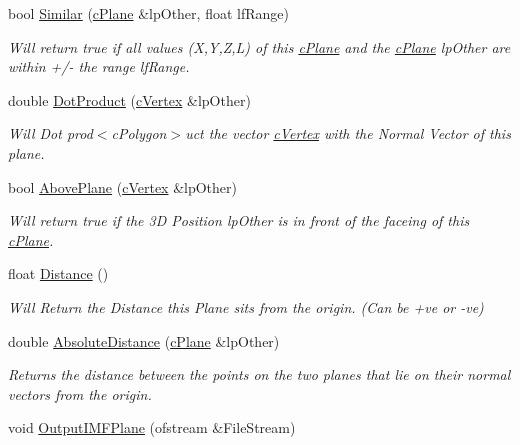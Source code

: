 \begin{DoxyCompactItemize}
bool \hyperlink{classc_plane_a54a4b9d1cc5624882862ea31f3d0df47}{Similar} (\hyperlink{classc_plane}{cPlane} \&lpOther, float lfRange)
\begin{DoxyCompactList}\small\item\em Will return true if all values (X,Y,Z,L) of this \hyperlink{classc_plane}{cPlane} and the \hyperlink{classc_plane}{cPlane} lpOther are within +/-\/ the range lfRange. \item\end{DoxyCompactList}\item 
double \hyperlink{classc_plane_a1861b4a3e79e16889324f0c9e580fc06}{DotProduct} (\hyperlink{classc_vertex}{cVertex} \&lpOther)
\begin{DoxyCompactList}\small\item\em Will Dot prod$<$cPolygon$>$uct the vector \hyperlink{classc_vertex}{cVertex} with the Normal Vector of this plane. \item\end{DoxyCompactList}\item 
bool \hyperlink{classc_plane_a44e9d118b30acf0b618ada7de16aa905}{AbovePlane} (\hyperlink{classc_vertex}{cVertex} \&lpOther)
\begin{DoxyCompactList}\small\item\em Will return true if the 3D Position lpOther is in front of the faceing of this \hyperlink{classc_plane}{cPlane}. \item\end{DoxyCompactList}\item 
float \hyperlink{classc_plane_a791c2367a99bb9818e4235962bfe504f}{Distance} ()
\begin{DoxyCompactList}\small\item\em Will Return the Distance this Plane sits from the origin. (Can be +ve or -\/ve) \item\end{DoxyCompactList}\item 
double \hyperlink{classc_plane_a041eaa860e54ab87fb06adc08d43fc2d}{AbsoluteDistance} (\hyperlink{classc_plane}{cPlane} \&lpOther)
\begin{DoxyCompactList}\small\item\em Returns the distance between the points on the two planes that lie on their normal vectors from the origin. \item\end{DoxyCompactList}\item 
void \hyperlink{classc_plane_af1f640b742cafe760cb28d8c851b87cf}{OutputIMFPlane} (ofstream \&FileStream)

\end{DoxyCompactItemize}
